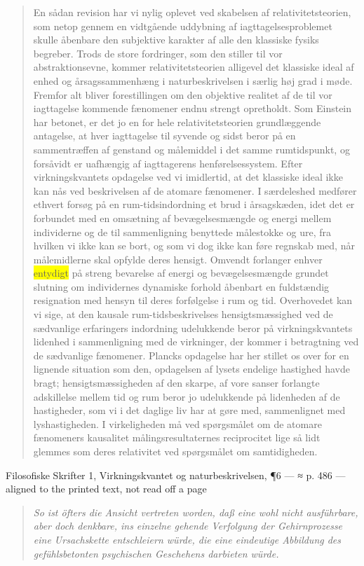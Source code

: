 \documentclass[11pt]{article}
\newcommand{\dcite}[1]{{\nopagebreak\raggedleft\small #1\par}\medskip}
\newcommand{\tlg}[1]{{\setlength{\fboxsep}{0.8pt}\colorbox{yellow}{#1}}}
\newcommand{\olg}[1]{{\setlength{\fboxsep}{0.8pt}\colorbox{cyan!25}{#1}}}
\begin{document}
\begin{quote}
En sådan revision har vi nylig oplevet ved skabelsen af relativitetsteorien, som netop gennem en vidtgående uddybning af iagttagelsesproblemet skulle åbenbare den subjektive karakter af alle den klassiske fysiks begreber. Trods de store fordringer, som den stiller til vor abstraktionsevne, kommer relativitetsteorien alligevel det klassiske ideal af enhed og årsagssammenhæng i naturbeskrivelsen i særlig høj grad i møde. Fremfor alt bliver forestillingen om den objektive realitet af de til vor iagttagelse kommende fænomener endnu strengt opretholdt. Som Einstein har betonet, er det jo en for hele relativitetsteorien grundlæggende antagelse, at hver iagttagelse til syvende og sidst beror på en sammentræffen af genstand og målemiddel i det samme rumtidspunkt, og forsåvidt er uafhængig af iagttagerens henførelsessystem. Efter virkningskvantets opdagelse ved vi imidlertid, at det klassiske ideal ikke kan nås ved beskrivelsen af de atomare fænomener. I særdeleshed medfører ethvert forsøg på en rum-tidsindordning et brud i årsagskæden, idet det er forbundet med en omsætning af bevægelsesmængde og energi mellem individerne og de til sammenligning benyttede målestokke og ure, fra hvilken vi ikke kan se bort, og som vi dog ikke kan føre regnskab med, når målemidlerne skal opfylde deres hensigt. Omvendt forlanger enhver \tlg{entydigt} på streng bevarelse af energi og bevægelsesmængde grundet slutning om individernes dynamiske forhold åbenbart en fuldstændig resignation med hensyn til deres forfølgelse i rum og tid. Overhovedet kan vi sige, at den kausale rum-tidsbeskrivelses hensigtsmæssighed ved de sædvanlige erfaringers indordning udelukkende beror på virkningskvantets lidenhed i sammenligning med de virkninger, der kommer i betragtning ved de sædvanlige fænomener. Plancks opdagelse har her stillet os over for en lignende situation som den, opdagelsen af lysets endelige hastighed havde bragt; hensigtsmæssigheden af den skarpe, af vore sanser forlangte adskillelse mellem tid og rum beror jo udelukkende på lidenheden af de hastigheder, som vi i det daglige liv har at gøre med, sammenlignet med lyshastigheden. I virkeligheden må ved spørgsmålet om de atomare fænomeners kausalitet målingsresultaternes reciprocitet lige så lidt glemmes som deres relativitet ved spørgsmålet om samtidigheden.
\end{quote}
\dcite{Filosofiske Skrifter 1, Virkningskvantet og naturbeskrivelsen, ¶6 — ≈ p. 486 — aligned to the printed text, not read off a page}
{\footnotesize\begin{quote}\itshape
So ist öfters die Ansicht vertreten worden, daß eine wohl nicht ausführbare, aber doch denkbare, ins einzelne gehende Verfolgung der Gehirnprozesse eine Ursachskette entschleiern würde, die eine \olg{eindeutige} Abbildung des gefühlsbetonten psychischen Geschehens darbieten würde.
\end{quote}}
\end{document}
